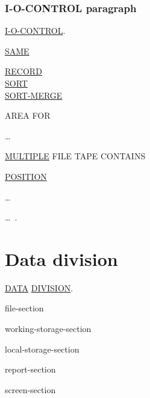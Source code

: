 \documentclass[a4paper,oneside,svgnames]{scrbook}
\makeatletter
\newcommand{\key}[1]{\underline{#1}}
\newcommand{\deleted}[1]{%
  \colorbox{red!75}{#1}}
\newcommand{\pending}[1]{%
  \textcolor{gray!75}{#1}}
\newenvironment{0-1}{$\left[ \begin{tabular}{@{}l@{}}}{\end{tabular} \right]$}
\newenvironment{1=}{$\left\{ \begin{tabular}{@{}l@{}}}{\end{tabular} \right\}$}
\makeatother
\begin{document}
\subsection{I-O-CONTROL paragraph}
\begin{0-1}
  \key{I-O-CONTROL}.
\end{0-1}\newline
\begin{1=}
  \key{SAME}
  \begin{0-1}
    \key{RECORD} \\
    \key{SORT} \\
    \key{SORT-MERGE}
  \end{0-1}
  AREA FOR
  \begin{1=}
    \filename
  \end{1=}\ldots \\

  \deleted{
    \key{MULTIPLE} FILE TAPE CONTAINS
    \begin{1=}
      \filename
      \begin{0-1}
        \key{POSITION} \integer
      \end{0-1}
    \end{1=}\ldots
  }
\end{1=}\ldots\ {}.

\chapter{Data division}

\begin{0-1}
  \key{DATA} \key{DIVISION}.
\end{0-1}\newline
\begin{0-1}
  file-section
\end{0-1}\newline
\begin{0-1}
  working-storage-section
\end{0-1}\newline
\begin{0-1}
  local-storage-section
\end{0-1}\newline
\begin{0-1}
  \pending{report-section}
\end{0-1}\newline
\begin{0-1}
  screen-section
\end{0-1}\newline
\end{document}
